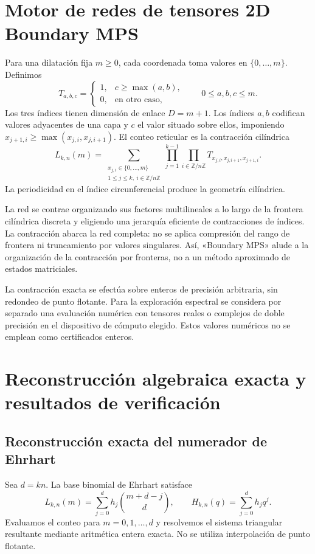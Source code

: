 \documentclass[11pt,a4paper]{article}
\theoremstyle{definition}
\begin{document}
\section{Motor de redes de tensores 2D Boundary MPS}

Para una dilatación fija $m\ge0$, cada coordenada toma valores en $\{0,\ldots,m\}$. Definimos
\[
T_{a,b,c}=
\begin{cases}
1,&c\ge\max(a,b),\\
0,&\text{en otro caso},
\end{cases}
\qquad 0\le a,b,c\le m.
\]
Los tres índices tienen dimensión de enlace $D=m+1$. Los índices $a,b$ codifican valores adyacentes de una capa y $c$ el valor situado sobre ellos, imponiendo $x_{j+1,i}\ge\max(x_{j,i},x_{j,i+1})$. El conteo reticular es la contracción cilíndrica
\[
L_{k,n}(m)=
\sum_{\substack{x_{j,i}\in\{0,\ldots,m\}\\1\le j\le k,\ i\in\mathbb Z/n\mathbb Z}}
\prod_{j=1}^{k-1}\prod_{i\in\mathbb Z/n\mathbb Z}
T_{x_{j,i},x_{j,i+1},x_{j+1,i}}.
\]
La periodicidad en el índice circunferencial produce la geometría cilíndrica.

La red se contrae organizando sus factores multilineales a lo largo de la
frontera cilíndrica discreta y eligiendo una jerarquía eficiente de
contracciones de índices. La contracción abarca la red completa: no se
aplica compresión del rango de frontera ni truncamiento por valores
singulares. Así, «Boundary MPS» alude a la organización de la contracción
por fronteras, no a un método aproximado de estados matriciales.

La contracción exacta se efectúa sobre enteros de precisión arbitraria,
sin redondeo de punto flotante. Para la exploración espectral se considera
por separado una evaluación numérica con tensores reales o complejos de
doble precisión en el dispositivo de cómputo elegido. Estos valores
numéricos no se emplean como certificados enteros.

\section{Reconstrucción algebraica exacta y resultados de verificación}

\subsection{Reconstrucción exacta del numerador de Ehrhart}

Sea $d=kn$. La base binomial de Ehrhart satisface
\[
L_{k,n}(m)=\sum_{j=0}^{d}h_j\binom{m+d-j}{d},
\qquad H_{k,n}(q)=\sum_{j=0}^{d}h_jq^j.
\]
Evaluamos el conteo para $m=0,1,\ldots,d$ y resolvemos el sistema
triangular resultante mediante aritmética entera exacta. No se utiliza
interpolación de punto flotante.
\end{document}
